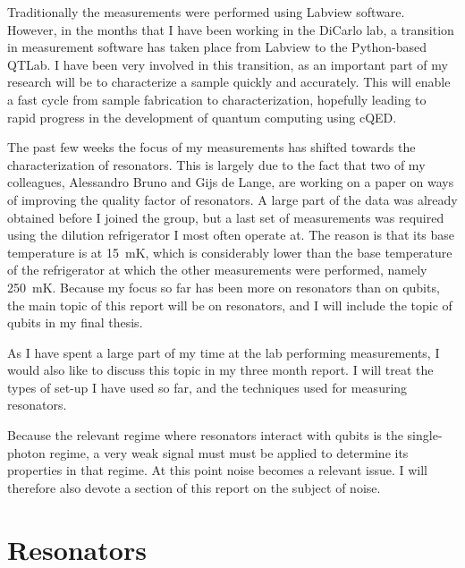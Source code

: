 \documentclass[12pt]{report}
\begin{document}
Traditionally the measurements were performed using Labview software. However, in the months that I have been working in the DiCarlo lab, a transition in measurement software has taken place from Labview to the Python-based QTLab. I have been very involved in this transition, as an important part of my research will be to characterize a sample quickly and accurately. This will enable a fast cycle from sample fabrication to characterization, hopefully leading to rapid progress in the development of quantum computing using cQED.

The past few weeks the focus of my measurements has shifted towards the characterization of resonators. This is largely due to the fact that two of my colleagues, Alessandro Bruno and Gijs de Lange, are working on a paper on ways of improving the quality factor of resonators. A large part of the data was already obtained before I joined the group, but a last set of measurements was required using the dilution refrigerator I most often operate at. The reason is that its base temperature is at \SI{15}{\milli \kelvin}, which is considerably lower than the base temperature of the refrigerator at which the other measurements were performed, namely \SI{250}{\milli \kelvin}. Because my focus so far has been more on resonators than on qubits, the main topic of this report will be on resonators, and I will include the topic of qubits in my final thesis.

As I have spent a large part of my time at the lab performing measurements, I would also like to discuss this topic in my three month report. I will treat the types of set-up I have used so far, and the techniques used for measuring resonators.

Because the relevant regime where resonators interact with qubits is the single-photon regime, a very weak signal must must be applied to determine its properties in that regime. At this point noise becomes a relevant issue. I will therefore also devote a section of this report on the subject of noise.

\newpage














\chapter{Resonators}
\end{document}

